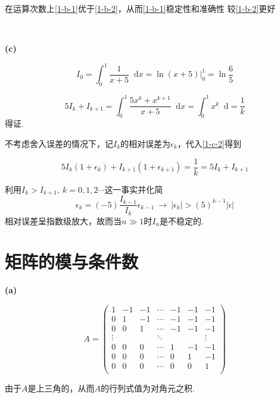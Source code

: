\documentclass[UTF8]{ctexart}
\newcommand*{\dif}{\mathop{}\!\mathrm{d}}
\begin{document}
在运算次数上\eqref{1-b-1}优于\eqref{1-b-2}，从而\eqref{1-b-1}稳定性和准确性
较\eqref{1-b-2}更好

~\

\noindent\textbf{(c)}

\begin{equation}\label{1-c-1}
I_0=\int_0^1\frac{1}{x+5}\dif x=\ln(x+5)\Big|_0^1=\ln\frac{6}{5}
\end{equation}

\begin{equation}\label{1-c-2}
5I_k+I_{k+1}=\int_0^1\frac{5x^k+x^{k+1}}{x+5}\dif x=\int_0^1 x^k\dif=\frac{1}{k}
\end{equation}
得证.

不考虑舍入误差的情况下，记$I_k$的相对误差为$\epsilon_k$，代入\eqref{1-c-2}得到

\begin{equation}\label{1-c-3}
5I_k(1+\epsilon_k)+I_{k+1}(1+\epsilon_{k+1})=\frac{1}{k}=5I_k+I_{k+1}
\end{equation}

利用$I_k>I_{k+1},\ k=0,1,2\cdots$这一事实并化简
\begin{equation}\label{1-c-4}
\epsilon_k=(-5)\frac{I_{k-1}}{I_k}\epsilon_{k-1}\ \rightarrow\ |\epsilon_{k}|>(5)^{k-1}|\epsilon|
\end{equation}
相对误差呈指数级放大，故而当$n\gg 1$时$I_n$是不稳定的.

\section{矩阵的模与条件数}

\noindent\textbf{(a)}

$$A=
\left(
    \begin{array}{ccccccc}
        1 & -1 & -1 & \cdots & -1 & -1 & -1\\
        0 & 1  & -1 & \cdots & -1 & -1 & -1\\
        0 & 0  & 1  & \cdots & -1 & -1 & -1\\
        \vdots & & & \ddots & & & \vdots \\
        0 & 0  & 0  & \cdots & 1  & -1 & -1\\
        0 & 0  & 0  & \cdots & 0  & 1  & -1\\
        0 & 0  & 0  & \cdots & 0  & 0  & 1\\
    \end{array}
\right)
$$

由于$A$是上三角的，从而$A$的行列式值为对角元之积.
\end{document}
